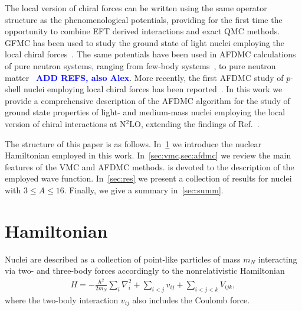 \documentclass[aps,prc,twocolumn,superscriptaddress,showpacs,floatfix,nofootinbib]{revtex4-1}
\newcommand{\blue}[1]{\protect\textcolor{blue}{#1}}
\begin{document}
The local version of chiral forces can be written using the same operator
structure as the phenomenological potentials, providing for the first time
the opportunity to combine EFT derived interactions and exact QMC methods.
GFMC has been used to study the ground state of light nuclei employing 
the local chiral forces~\cite{Gezerlis:2013,Gezerlis:2014,Tews:2016,Lynn:2016,Lynn:2017}.
The same potentials have been used in AFDMC calculations of pure neutron systems, 
ranging from few-body systems~\cite{Lynn:2014,Klos:2016,Zhao:2016,Gandolfi:2017}, to pure
neutron matter~\cite{Gezerlis:2013,Gezerlis:2014,Tews:2016}
\blue{\bf ADD REFS, also Alex}.
More recently, the first AFDMC study of $p$-shell nuclei employing local
chiral forces has been reported~\cite{Lonardoni:2017afdmc}.
In this work we provide a comprehensive description of the AFDMC algorithm 
for the study of ground state properties of light- and medium-mass nuclei 
employing the local version of chiral interactions at N$^2$LO, extending
the findings of Ref.~\cite{Lonardoni:2017afdmc}.

The structure of this paper is as follows. 
In~\cref{sec:ham} we introduce the nuclear Hamiltonian employed in this work.
In~\cref{sec:vmc,sec:afdmc} we review the main features of the VMC and AFDMC methods.
 is devoted to the description of the employed wave function. 
In~\cref{sec:res} we present a collection of results for nuclei
with $3\le A\le 16$. 
Finally, we give a summary in~\cref{sec:summ}.


\section{Hamiltonian}
\label{sec:ham}
Nuclei are described as a collection of point-like particles of mass $m_N$ interacting 
via two- and three-body forces accordingly to the nonrelativistic Hamiltonian
\begin{align}
	H=-\frac{\hbar^2}{2m_N}\sum_i \nabla_i^2+\sum_{i<j}v_{ij}+\sum_{i<j<k}V_{ijk} ,
\end{align}
where the two-body interaction $v_{ij}$ also includes the Coulomb force.
\end{document}
